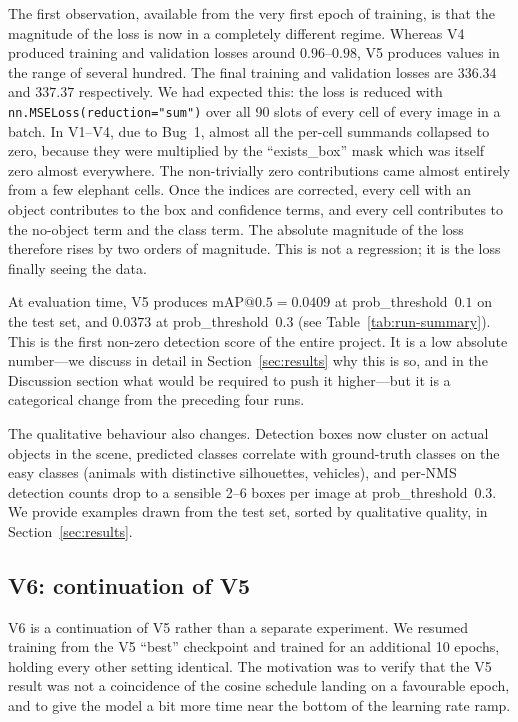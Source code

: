 The first observation, available from the very first epoch of training, is
that the magnitude of the loss is now in a completely different regime.
Whereas V4 produced training and validation losses around $0.96$--$0.98$, V5
produces values in the range of several hundred. The final training and
validation losses are $336.34$ and $337.37$ respectively. We had expected this:
the loss is reduced with \texttt{nn.MSELoss(reduction="sum")} over all 90
slots of every cell of every image in a batch. In V1--V4, due to Bug~1, almost
all the per-cell summands collapsed to zero, because they were multiplied by
the ``exists\_box'' mask which was itself zero almost everywhere. The
non-trivially zero contributions came almost entirely from a few elephant
cells. Once the indices are corrected, every cell with an object contributes
to the box and confidence terms, and every cell contributes to the no-object
term and the class term. The absolute magnitude of the loss therefore rises
by two orders of magnitude. This is not a regression; it is the loss finally
seeing the data.

At evaluation time, V5 produces $\mathrm{mAP}@0.5 = 0.0409$ at
prob\_threshold~$0.1$ on the test set, and $0.0373$ at prob\_threshold~$0.3$
(see Table~\ref{tab:run-summary}). This is the first non-zero detection score
of the entire project. It is a low absolute number---we discuss in detail in
Section~\ref{sec:results} why this is so, and in the Discussion section what
would be required to push it higher---but it is a categorical change from the
preceding four runs.

The qualitative behaviour also changes. Detection boxes now cluster on actual
objects in the scene, predicted classes correlate with ground-truth classes on
the easy classes (animals with distinctive silhouettes, vehicles), and per-NMS
detection counts drop to a sensible 2--6 boxes per image at
prob\_threshold~$0.3$. We provide examples drawn from the test set, sorted by
qualitative quality, in Section~\ref{sec:results}.

\subsection{V6: continuation of V5}
\label{sec:experiments:v6}

V6 is a continuation of V5 rather than a separate experiment. We resumed
training from the V5 ``best'' checkpoint and trained for an additional 10
epochs, holding every other setting identical. The motivation was to verify
that the V5 result was not a coincidence of the cosine schedule landing on a
favourable epoch, and to give the model a bit more time near the bottom of the
learning rate ramp.

